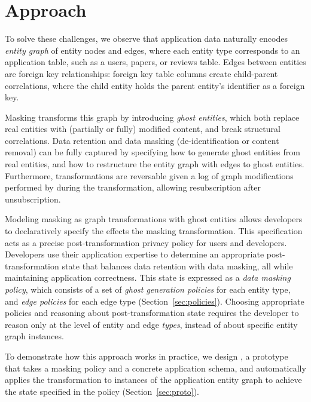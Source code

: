 \section{Approach}
To solve these challenges, we observe that application data naturally encodes \emph{entity graph} of
entity nodes and edges, where each entity type corresponds to an application table, such as a users,
papers, or reviews table. Edges between entities are foreign key relationships: foreign key table
columns create child-parent correlations, where the child entity holds the parent entity's
identifier as a foreign key. 

Masking transforms this graph by introducing \emph{ghost entities}, which both
replace real entities with (partially or fully) modified content, and break structural correlations.
Data retention and data masking (de-identification or content removal) can be fully captured
by specifying how to generate ghost entities from real entities, and how to restructure the entity
graph with edges to ghost entities. 
Furthermore, transformations are reversable given a log of graph
modifications performed by during the transformation, allowing \eg resubscription after
unsubscription.

Modeling masking as graph transformations with ghost entities allows developers to declaratively
specify the effects the masking transformation. This specification acts as a precise
post-transformation privacy policy for users and developers.
Developers use their application expertise to determine an appropriate post-transformation state
that balances data retention with data masking, all while maintaining application correctness.
This state is expressed as a \emph{data masking policy}, which consists of a set of
\emph{ghost generation policies} for each entity type, and \emph{edge policies} for each edge type
(Section~\ref{sec:policies}). 
Choosing appropriate policies and reasoning about post-transformation state requires the developer
to reason only at the level of entity and edge \emph{types}, instead of about specific entity
graph instances.

To demonstrate how this approach works in practice, we design \sys, a prototype that takes a
masking policy and a concrete application schema, and automatically applies the
transformation to instances of the application entity graph to achieve the state specified
in the policy (Section~\ref{sec:proto}).

